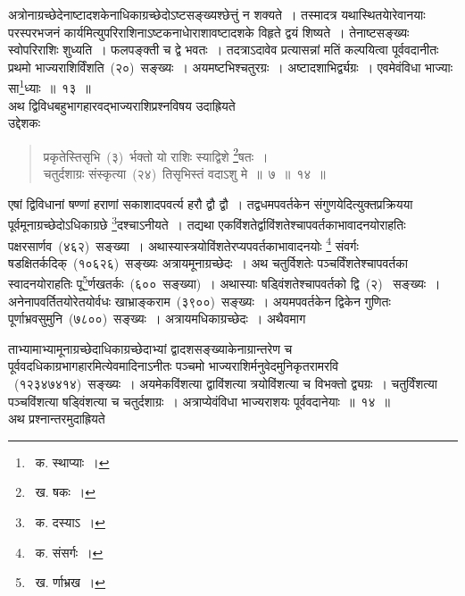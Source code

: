 \documentclass[11pt, openany]{book}
\begin{document}
\indent
अत्रोनाग्रच्छेदेनाष्टादशकेनाधिकाग्रच्छेदोऽष्टसङ्ख्यश्छेत्तुं न शक्यते~।
तस्मादत्र यथास्थितयाेरेवानयाः परस्परभजनं कार्यमित्युपरिराशिनाऽष्टकनाधाेराशावष्टादशके विहृते द्वयं शिष्यते~। तेनाष्टसङ्ख्यः स्वोपरिराशिः शुध्यति~। फलपङ्क्ती च द्वे भवतः~। तदत्राऽदावेव प्रत्यासन्नां मतिं
कल्पयित्वा पूर्ववदानीतः प्रथमो भाज्यराशिर्विंशति~(२०)~सङ्ख्यः~। अयमष्टभिश्चतुरग्रः~।
अष्टादशाभिर्द्व्यग्रः~। एवमेवंविधा भाज्याः सा\renewcommand\thefootnote{१}\footnote{~क. स्थाप्याः~।}ध्याः~॥~१३~॥\\

\indent
अथ द्विविधबहुभागहारवद्भाज्यराशिप्रश्नविषय उदाह्रियते \textendash\\

उद्देशकः \textendash
\begin{quote}
{\ku
प्रकृतेस्तिसृभि~(३)~र्भक्तो यो राशिः स्याद्विशे \renewcommand\thefootnote{२}\footnote{~ख. षकः~।}षतः~।\\
चतुर्दशाग्रः संस्कृत्या~(२४)~तिसृभिस्तं वदाऽशु मे~॥~७~॥~१४~॥}
\end{quote}
\indent
एषां द्विविधानां षण्णां हराणां सकाशादपवर्त्य हरौ द्वौ द्वौ~। तद्वधमपवर्तकेन संगुणयेदित्युक्तप्रक्रियया पूर्वमूनाग्रच्छेदोऽधिकाग्रछे \renewcommand\thefootnote{३}\footnote{~क. दस्याऽ~।}दश्चाऽनीयते~। तद्यथा एकविंशतेर्द्वाविंशतेश्चापवर्तकाभावादनयोराहतिः पक्षरसार्णव~(४६२)~सङ्ख्या~। अथास्यास्त्रयोविंशतेरप्यपवर्तकाभावादनयोः \renewcommand\thefootnote{४}\footnote{~क. संसर्गः~।} संवर्गः षडक्षितर्कदिक्~(१०६२६)~सङ्ख्यः अत्रायमूनाग्रच्छेदः~। अथ चतुर्विशतेः पञ्चर्विंशतेश्चापवर्तका स्वादनयोराहतिः पू\renewcommand\thefootnote{५}\footnote{~ख. र्णाभ्रख~।}र्णखतर्कः~(६००~सङ्ख्या)~। अथास्याः षड्विंशतेश्चापवर्तको द्वि~(२)~ सङ्ख्यः~।अनेनापवर्तितयोरेतयोर्वधः खाभ्राङ्कराम~(३९००)~सङ्ख्यः~। अयमपवर्तकेन द्विकेन गुणितः पूर्णाभ्रवसुमुनि~(७८००)~सङ्ख्यः~। अत्रायमधिकाग्रच्छेदः~। अथैवमाग \textendash

       
\newpage
\thispagestyle{fancy}
\fancyhf{}

\noindent
ताभ्यामाभ्यामूनाग्रच्छेदाधिकाग्रच्छेदाभ्यां द्वादशसङ्ख्याकेनाग्रान्तरेण च
पूर्ववदधिकाग्रभागहारमित्येवमादिनाऽनीतः पञ्चमो भाज्यराशिर्मनुवेदमुनिकृतरामरवि
~(१२३४७४१४)~सङ्ख्यः~। अयमेकविंशत्या द्वाविंशत्या त्रयोविंशत्या च विभक्तो द्व्यग्रः~। चतुर्विंशत्या पञ्चविंशत्या षड्विंशत्या च चतुर्दशाग्रः~। अत्राप्येवंविधा भाज्यराशयः पूर्ववदानेयाः~॥~१४~॥\\
अथ प्रश्नान्तरमुदाह्रियते\textendash\\
\end{document}
